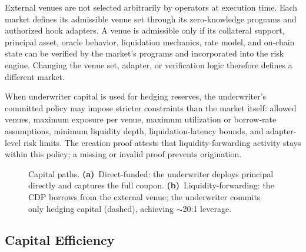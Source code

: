 External venues are not selected arbitrarily by operators at execution time. Each market defines its admissible venue set through its zero-knowledge programs and authorized hook adapters. A venue is admissible only if its collateral support, principal asset, oracle behavior, liquidation mechanics, rate model, and on-chain state can be verified by the market's programs and incorporated into the risk engine. Changing the venue set, adapter, or verification logic therefore defines a different market.

When underwriter capital is used for hedging reserves, the underwriter's committed policy may impose stricter constraints than the market itself: allowed venues, maximum exposure per venue, maximum utilization or borrow-rate assumptions, minimum liquidity depth, liquidation-latency bounds, and adapter-level risk limits. The creation proof attests that liquidity-forwarding activity stays within this policy; a missing or invalid proof prevents origination.

\begin{figure}[ht]
  \centering
  \caption{Capital paths. \textbf{(a)}~Direct-funded: the underwriter deploys principal directly and captures the full coupon. \textbf{(b)}~Liquidity-forwarding: the CDP borrows from the external venue; the underwriter commits only hedging capital (dashed), achieving ${\sim}$20:1 leverage.}
  \label{fig:capital}
\end{figure}

\subsection{Capital Efficiency}

